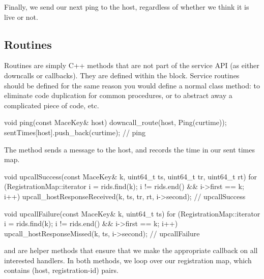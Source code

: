 Finally, we send our next ping to the host, regardless of whether we
think it is live or not.


\subsection{Routines}

Routines are simply C++ methods that are not part of the service API
(as either downcalls or callbacks).  They are defined within the
 block.  Service routines should be defined for the
same reason you would define a normal class method: to eliminate code
duplication for common procedures, or to abstract away a complicated
piece of code, etc.


\begin{programlisting}
  void ping(const MaceKey& host) {
    downcall_route(host, Ping(curtime));
    sentTimes[host].push_back(curtime);
  } // ping
\end{programlisting}

The  method sends a  message to the
host, and records the time in our sent times map.

\begin{programlisting}
  void upcallSuccess(const MaceKey& k, uint64_t ts, uint64_t tr, uint64_t rt) {
    for (RegistrationMap::iterator i = rids.find(k); i != rids.end() && i->first == k; i++) {
      upcall_hostResponseReceived(k, ts, tr, rt, i->second);
    }
  } // upcallSuccess

  void upcallFailure(const MaceKey& k, uint64_t ts) {
    for (RegistrationMap::iterator i = rids.find(k); i != rids.end() && i->first == k; i++) {
      upcall_hostResponseMissed(k, ts, i->second);
    }
  } // upcallFailure
\end{programlisting}

 and  are helper
methods that ensure that we make the appropriate callback on all
interested handlers.  In both methods, we loop over our registration
map, which contains (host, registration-id) pairs.

